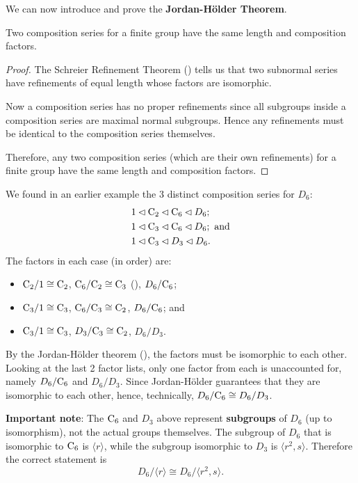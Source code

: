 We can now introduce and prove the \textbf{Jordan-H\"older Theorem}.
\begin{theorem}\label{thrm-jordan-holder}
    Two composition series for a finite group have the same length and composition factors.
\end{theorem}
\begin{proof}
    The Schreier Refinement Theorem () tells us that two subnormal series have refinements of equal length whose factors are isomorphic.
    
    Now a composition series has no proper refinements since all subgroups inside a composition series are maximal normal subgroups. Hence any refinements must be identical to the composition series themselves.
    
    Therefore, any two composition series (which are their own refinements) for a finite group have the same length and composition factors.
\end{proof}

\begin{example}
    We found in an earlier example the 3 distinct composition series for $D_6$:
    \begin{align*}
        &1 \lhd \mathrm{C}_{2} \lhd \mathrm{C}_{6} \lhd D_6;\\
        &1 \lhd \mathrm{C}_{3} \lhd \mathrm{C}_{6} \lhd D_6; \text{ and}\\
        &1 \lhd \mathrm{C}_{3} \lhd D_3 \lhd D_6.
    \end{align*}
    The factors in each case (in order) are:
    \begin{itemize}
        \item $\mathrm{C}_{2}/1 \cong \mathrm{C}_{2}$, $\mathrm{C}_{6}/\mathrm{C}_{2} \cong \mathrm{C}_{3}$ (), $D_6 / \mathrm{C}_{6}$;
        \item $\mathrm{C}_{3}/1 \cong \mathrm{C}_{3}$, $\mathrm{C}_{6}/\mathrm{C}_{3} \cong \mathrm{C}_{2}$, $D_6 / \mathrm{C}_{6}$; and
        \item $\mathrm{C}_{3}/1 \cong \mathrm{C}_{3}$, $D_3 / \mathrm{C}_{3} \cong \mathrm{C}_{2}$, $D_6 / D_3$.
    \end{itemize}
    By the Jordan-H\"older theorem (), the factors must be isomorphic to each other. Looking at the last 2 factor lists, only one factor from each is unaccounted for, namely $D_6 / \mathrm{C}_{6}$ and $D_6 / D_3$. Since Jordan-H\"older guarantees that they are isomorphic to each other, hence, technically, $D_6 / \mathrm{C}_{6} \cong D_6 / D_3$.

    \textbf{Important note}: The $\mathrm{C}_{6}$ and $D_3$ above represent \textbf{subgroups} of $D_6$ (up to isomorphism), not the actual groups themselves. The subgroup of $D_6$ that is isomorphic to $\mathrm{C}_{6}$ is $\langle r \rangle$, while the subgroup isomorphic to $D_3$ is $\langle r^2, s\rangle$. Therefore the correct statement is
    \[
        D_6 / \langle r \rangle \cong D_6 / \langle r^2, s\rangle.
    \]
\end{example}

